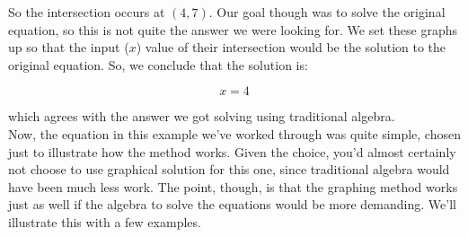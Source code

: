 So the intersection occurs at $(4,7)$. Our goal though was to solve the original equation, so this is not quite the answer we were looking for. We set these graphs up so that the input ($x$) value of their intersection would be the solution to the original equation. So, we conclude that the solution is:

\begin{equation*}
	x=4
\end{equation*}

which agrees with the answer we got solving using traditional algebra.\\

Now, the equation in this example we’ve worked through was quite simple, chosen just to illustrate how the method works. Given the choice, you’d almost certainly not choose to use graphical solution for this one, since traditional algebra would have been much less work. The point, though, is that the graphing method works just as well if the algebra to solve the equations would be more demanding. We’ll illustrate this with a few examples.


